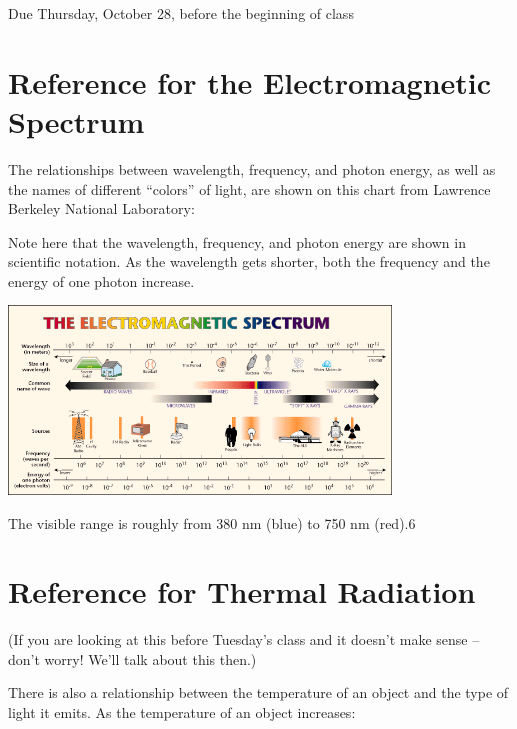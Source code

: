 \documentclass[12pt]{article}
\begin{document}
\Large
\centerline{}

\normalsize
\begin{center}
	Due Thursday, October 28, before the beginning of class
\end{center}

\bigskip

\section{Reference for the Electromagnetic Spectrum}

The relationships between wavelength, frequency, and photon energy, as well as the names of different ``colors'' of light, are shown on this chart from Lawrence Berkeley National Laboratory:

\begin{minipage}{0.35\textwidth}
	Note here that the wavelength, frequency, and photon energy are shown in scientific notation. As the wavelength gets shorter, both the frequency and the energy of one photon increase.
	\end{minipage}
\hspace{0.05\textwidth}
\begin{minipage}{0.\textwidth}
\begin{center}
	\includegraphics[width=4in]{EMSpec.png}
\end{center}
	\end{minipage}


The visible range is roughly from 380 nm (blue) to 750 nm (red).6

\section{Reference for Thermal Radiation}

(If you are looking at this before Tuesday's class and it doesn't make sense -- don't worry! We'll talk about this then.)

There is also a relationship between the temperature of an object and the type of light it emits. As the temperature of an object increases:
\end{document}
